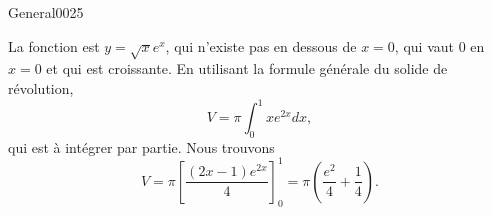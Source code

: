 \begin{corrige}{General0025}

La fonction est $y=\sqrt{x}e^x$, qui n'existe pas en dessous de $x=0$, qui vaut $0$ en $x=0$ et qui est croissante. En utilisant la formule générale du solide de révolution, 
\begin{equation}
	V=\pi\int_0^1x e^{2x}dx,
\end{equation}
qui est à intégrer par partie. Nous trouvons
\begin{equation}
	V=\pi\left[ \frac{ (2x-1) e^{2x} }{ 4 } \right]_0^1=\pi\left( \frac{ e^2 }{ 4 }+\frac{1}{ 4 } \right).
\end{equation}

\end{corrige}
